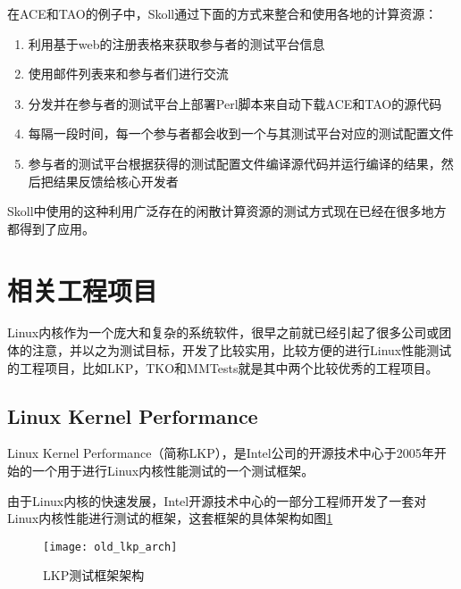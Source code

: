 在ACE和TAO的例子中，Skoll通过下面的方式来整合和使用各地的计算资源：
\begin{enumerate}
\item 利用基于web的注册表格来获取参与者的测试平台信息
\item 使用邮件列表来和参与者们进行交流
\item 分发并在参与者的测试平台上部署Perl脚本来自动下载ACE和TAO的源代码
\item 每隔一段时间，每一个参与者都会收到一个与其测试平台对应的测试配置文件
\item 参与者的测试平台根据获得的测试配置文件编译源代码并运行编译的结果，然后把结果反馈给核心开发者
\end{enumerate}

Skoll中使用的这种利用广泛存在的闲散计算资源的测试方式现在已经在很多地方都得到了应用。



\section{相关工程项目}

Linux内核作为一个庞大和复杂的系统软件，很早之前就已经引起了很多公司或团体的注意，并以之为测试目标，开发了比较实用，比较方便的进行Linux性能测试的工程项目，比如LKP\cite{chen2007keeping}，TKO\cite{bligh2006fully}和MMTests就是其中两个比较优秀的工程项目。

\subsection{Linux Kernel Performance}

Linux Kernel Performance（简称LKP），是Intel公司的开源技术中心于2005年开始的一个用于进行Linux内核性能测试的一个测试框架。

由于Linux内核的快速发展，Intel开源技术中心的一部分工程师开发了一套对Linux内核性能进行测试的框架，这套框架的具体架构如图\ref{fig:old_lkp_arch}

\begin{figure}[H]
\centering
\texttt{[image: old\_lkp\_arch]}
\caption{LKP测试框架架构}
\label{fig:old_lkp_arch}
\end{figure}

